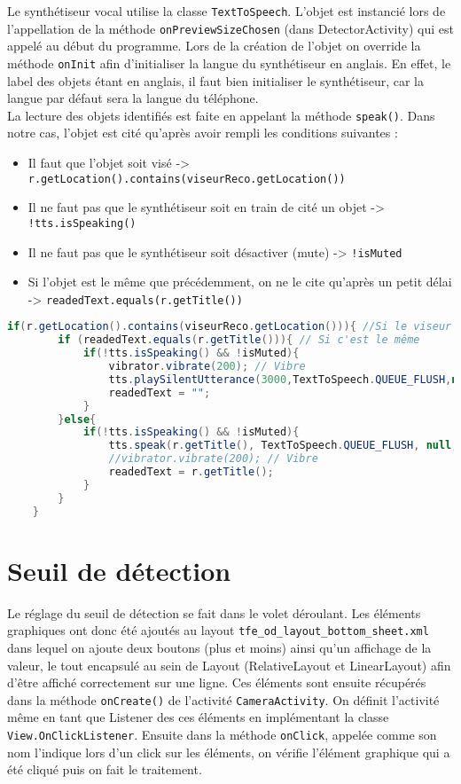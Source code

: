 \documentclass[UTF8]{EPURapport}
\begin{document}
Le synthétiseur vocal utilise la classe \verb|TextToSpeech|. L'objet est instancié lors de l'appellation de la méthode \verb|onPreviewSizeChosen| (dans DetectorActivity) qui est appelé au début du programme. Lors de la création de l'objet on override la méthode \verb|onInit| afin d'initialiser la langue du synthétiseur en anglais. En effet, le label des objets étant en anglais, il faut bien initialiser le synthétiseur, car la langue par défaut sera la langue du téléphone.\\

La lecture des objets identifiés est faite en appelant la méthode \verb|speak()|. Dans notre cas, l'objet est cité qu'après avoir rempli les conditions suivantes :\\

\begin{itemize}
	\item Il faut que l'objet soit visé -> \verb|r.getLocation().contains(viseurReco.getLocation())|
	\item Il ne faut pas que le synthétiseur soit en train de cité un objet ->  \verb|!tts.isSpeaking()|
	\item Il ne faut pas que le synthétiseur soit désactiver (mute) -> \verb|!isMuted|
	\item Si l'objet est le même que précédemment, on ne le cite qu'après un petit délai -> \verb|readedText.equals(r.getTitle())| \\
  \end{itemize}

\begin{lstlisting}[language=Java]
	if(r.getLocation().contains(viseurReco.getLocation())){ //Si le viseur est dans l'objet détecté && pas le même
		if (readedText.equals(r.getTitle())){ // Si c'est le même
			if(!tts.isSpeaking() && !isMuted){
				vibrator.vibrate(200); // Vibre
				tts.playSilentUtterance(3000,TextToSpeech.QUEUE_FLUSH,null);
				readedText = "";
			}
		}else{
			if(!tts.isSpeaking() && !isMuted){
				tts.speak(r.getTitle(), TextToSpeech.QUEUE_FLUSH, null, null); // Synthetiseur prononce le label de l'objet
				//vibrator.vibrate(200); // Vibre
				readedText = r.getTitle();
			}
		}
	}
\end{lstlisting}

\section{Seuil de détection}

Le réglage du seuil de détection se fait dans le volet déroulant. Les éléments graphiques ont donc été ajoutés au layout \verb|tfe_od_layout_bottom_sheet.xml| dans lequel on ajoute deux boutons (plus et moins) ainsi qu'un affichage de la valeur, le tout encapsulé au sein de Layout (RelativeLayout et LinearLayout) afin d'être affiché correctement sur une ligne. Ces éléments sont ensuite récupérés dans la méthode \verb|onCreate()| de l'activité \verb|CameraActivity|. On définit l'activité même en tant que Listener des ces éléments en implémentant la classe \verb|View.OnClickListener|. Ensuite dans la méthode \verb|onClick|, appelée comme son nom l'indique lors d'un click sur les éléments, on vérifie l'élément graphique qui a été cliqué puis on fait le traitement.
\end{document}

